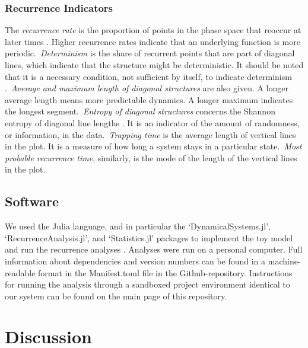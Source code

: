\documentclass[utf8]{FrontiersinVancouver}
\begin{document}
\subsubsection{Recurrence Indicators}
The \textit{recurrence rate} is the proportion of points in the phase space that reoccur at later times \citep{webber2005recurrence}. Higher recurrence rates indicate that an underlying function is more periodic.\ \textit{Determinism} is the share of recurrent points that are part of diagonal lines, which indicate that the structure might be deterministic. It should be noted that it is a necessary condition, not sufficient by itself, to indicate determinism \citep{marwanHowAvoidPotential2011}.\ \textit{Average and maximum length of diagonal structures} are also given. A longer average length means more predictable dynamics. A longer maximum indicates the longest segment.\ \textit{Entropy of diagonal structures} concerns the Shannon entropy of diagonal line lengths \citep{kraemerRecurrenceThresholdSelection2018}. It is an indicator of the amount of randomness, or information, in the data.\ \textit{Trapping time} is the average length of vertical lines in the plot. It is a measure of how long a system stays in a particular state.\ \textit{Most probable recurrence time}, similarly, is the mode of the length of the vertical lines in the plot. 

\subsection{Software}
We used the Julia language, and in particular the `DynamicalSystems.jl', `RecurrenceAnalysis.jl', and `Statistics.jl' packages to implement the toy model and run the recurrence analyses \citep{bezanson2017julia, Datseris2018, DatserisParlitz2022}. Analyses were run on a personal computer. Full information about dependencies and version numbers can be found in a machine-readable format in the Manifest.toml file in the Github-repository. Instructions for running the analysis through a sandboxed project environment identical to our system can be found on the main page of this repository.


\section{Discussion}
\end{document}
